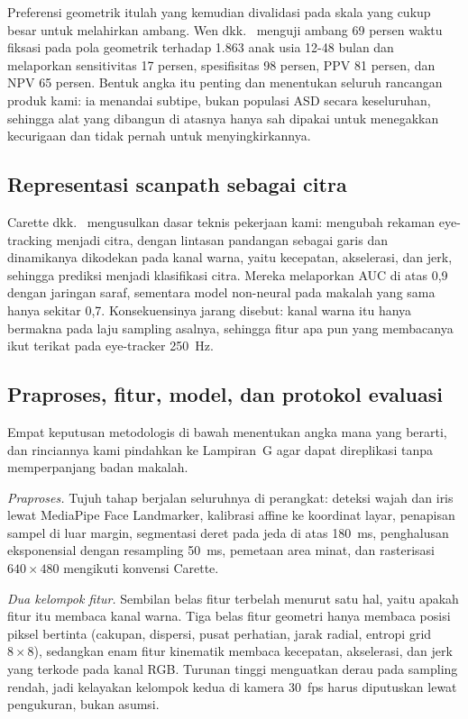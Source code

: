\documentclass{article}
\begin{document}
Preferensi geometrik itulah yang kemudian divalidasi pada skala yang cukup besar untuk
melahirkan ambang. Wen dkk.~\cite{wen2022} menguji ambang 69 persen waktu fiksasi pada pola
geometrik terhadap 1.863 anak usia 12-48 bulan dan melaporkan sensitivitas 17 persen,
spesifisitas 98 persen, PPV 81 persen, dan NPV 65 persen. Bentuk angka itu penting dan
menentukan seluruh rancangan produk kami: ia menandai subtipe, bukan populasi ASD secara
keseluruhan, sehingga alat yang dibangun di atasnya hanya sah dipakai untuk menegakkan
kecurigaan dan tidak pernah untuk menyingkirkannya.

\subsection{Representasi scanpath sebagai citra}

Carette dkk.~\cite{carette2019} mengusulkan dasar teknis pekerjaan kami: mengubah rekaman
eye-tracking menjadi citra, dengan lintasan pandangan sebagai garis dan dinamikanya
dikodekan pada kanal warna, yaitu kecepatan, akselerasi, dan jerk, sehingga prediksi menjadi
klasifikasi citra. Mereka melaporkan AUC di atas 0,9 dengan jaringan saraf, sementara model
non-neural pada makalah yang sama hanya sekitar 0,7. Konsekuensinya jarang disebut: kanal
warna itu hanya bermakna pada laju sampling asalnya, sehingga fitur apa pun yang membacanya
ikut terikat pada eye-tracker 250~Hz.

\subsection{Praproses, fitur, model, dan protokol evaluasi}
\label{sec:tp-ringkas}

Empat keputusan metodologis di bawah menentukan angka mana yang berarti, dan rinciannya kami
pindahkan ke Lampiran~G agar dapat direplikasi tanpa memperpanjang badan makalah.

\emph{Praproses.} Tujuh tahap berjalan seluruhnya di perangkat: deteksi wajah dan iris lewat
MediaPipe Face Landmarker, kalibrasi affine ke koordinat layar, penapisan sampel di luar
margin, segmentasi deret pada jeda di atas 180~ms, penghalusan eksponensial dengan resampling
50~ms, pemetaan area minat, dan rasterisasi $640 \times 480$ mengikuti konvensi Carette.

\emph{Dua kelompok fitur.} Sembilan belas fitur terbelah menurut satu hal, yaitu apakah fitur
itu membaca kanal warna. Tiga belas fitur geometri hanya membaca posisi piksel bertinta
(cakupan, dispersi, pusat perhatian, jarak radial, entropi grid $8 \times 8$), sedangkan enam
fitur kinematik membaca kecepatan, akselerasi, dan jerk yang terkode pada kanal RGB. Turunan
tinggi menguatkan derau pada sampling rendah, jadi kelayakan kelompok kedua di kamera 30~fps
harus diputuskan lewat pengukuran, bukan asumsi.
\end{document}
